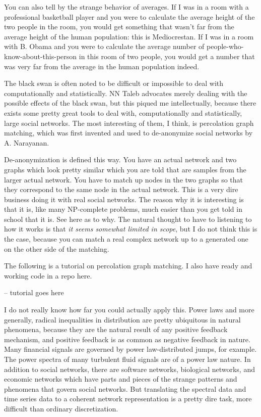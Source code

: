 \documentclass[12pt]{article}
\begin{document}
You can also tell by the strange behavior of averages. If I was in a room with a professional basketball player and you were to calculate the average height of the two people in the room, you would get something that wasn't far from the average height of the human population: this is Mediocrestan. If I was in a room with B. Obama and you were to calculate the average number of people-who-know-about-this-person in this room of two people, you would get a number that was very far from the average in the human population indeed.

The black swan is often noted to be difficult or impossible to deal with computationally and statistically. NN Taleb advocates merely dealing with the possible effects of the black swan, but this piqued me intellectually, because there exists some pretty great tools to deal with, computationally and statistically, large social networks. The most interesting of them, I think, is percolation graph matching, which was first invented and used to de-anonymize social networks by A. Narayanan.

De-anonymization is defined this way. You have an actual network and two graphs which look pretty similar which you are told that are samples from the larger actual network. You have to match up nodes in the two graphs so that they correspond to the same node in the actual network. This is a very dire business doing it with real social networks. The reason why it is interesting is that it is, like many NP-complete problems, much easier than you get told in school that it is. See here as to why. The natural thought to have to listening to how it works is that \emph{it seems somewhat limited in scope}, but I do not think this is the case, because you can match a real complex network up to a generated one on the other side of the matching.

The following is a tutorial on percolation graph matching. I also have ready and working code in a repo here.

-- tutorial goes here

I do not really know how far you could actually apply this. Power laws and more generally, radical inequalities in distribution are pretty ubiquitous in natural phenomena, because they are the natural result of any positive feedback mechanism, and positive feedback is as common as negative feedback in nature. Many financial signals are governed by power law-distributed jumps, for example. The power spectra of many turbulent fluid signals are of a power law nature. In addition to social networks, there are software networks, biological networks, and economic networks which have parts and pieces of the strange patterns and phenomena that govern social networks. But translating the spectral data and time series data to a coherent network representation is a pretty dire task, more difficult than ordinary discretization.
\end{document}
